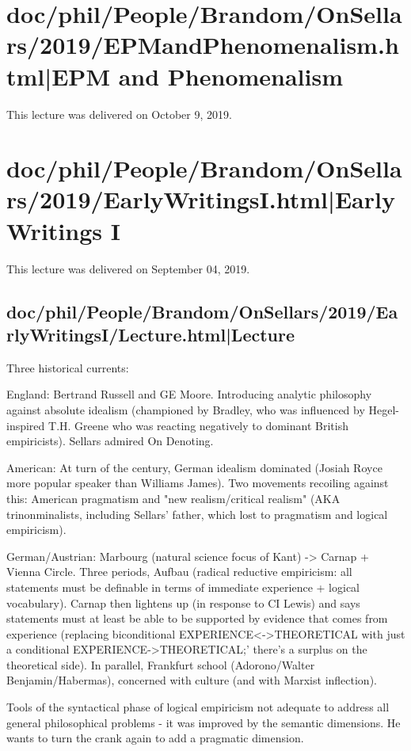 \documentclass[12pt,a4paper]{report}
\begin{document}
\section{doc/phil/People/Brandom/OnSellars/2019/EPMandPhenomenalism.html|EPM and Phenomenalism}
This lecture was delivered on October 9, 2019.

\section{doc/phil/People/Brandom/OnSellars/2019/EarlyWritingsI.html|Early Writings I}
This lecture was delivered on September 04, 2019.

\subsection{doc/phil/People/Brandom/OnSellars/2019/EarlyWritingsI/Lecture.html|Lecture}

Three historical currents:

England: Bertrand Russell and GE Moore. Introducing analytic philosophy against absolute idealism (championed by Bradley, who was influenced by Hegel-inspired T.H. Greene who was reacting negatively to dominant British empiricists). Sellars admired On Denoting.

American: At turn of the century, German idealism dominated (Josiah Royce more popular speaker than Williams James). Two movements recoiling against this: American pragmatism and "new realism/critical realism" (AKA trinonminalists, including Sellars' father, which lost to pragmatism and logical empiricism).

German/Austrian: Marbourg (natural science focus of Kant) -> Carnap + Vienna Circle. Three periods, Aufbau (radical reductive empiricism: all statements must be definable in terms of immediate experience + logical vocabulary). Carnap then lightens up (in response to CI Lewis) and says statements must at least be able to be supported by evidence that comes from experience (replacing biconditional EXPERIENCE<->THEORETICAL with just a conditional EXPERIENCE->THEORETICAL;' there's a surplus on the theoretical side).
In parallel, Frankfurt school (Adorono/Walter Benjamin/Habermas), concerned with culture (and with Marxist inflection).

Tools of the syntactical phase of logical empiricism not adequate to address all general philosophical problems - it was improved by the semantic dimensions. He wants to turn the crank again to add a pragmatic dimension.
\end{document}
